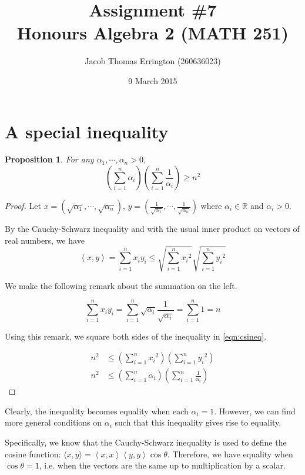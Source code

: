\documentclass{article}
\author{Jacob Thomas Errington (260636023)}
\title{Assignment \#7\\Honours Algebra 2 (MATH 251)}
\date{9 March 2015}
\newtheorem{proposition}{Proposition}
\newcommand{\R}{\mathbb{R}}
\newcommand{\norm}[1]{\left\langle #1, #1 \right\rangle}
\begin{document}
\maketitle

\section{A special inequality}

\begin{proposition}
    For any $\alpha_1, \cdots, \alpha_n > 0$,
    $$\left( \sum_{i=1}^n \alpha_i \right) \left( \sum_{i=1}^n \frac{1}{\alpha_i} \right) \geq n^2$$
\end{proposition}

\begin{proof}
    Let
    $x = (\sqrt{\alpha_1}, \cdots, \sqrt{\alpha_n})$,
    $y = (\frac{1}{\sqrt{\alpha_1}}, \cdots, \frac{1}{\sqrt{\alpha_n}})$
    where $\alpha_i \in \R$ and $\alpha_i > 0$.

    By the Cauchy-Schwarz inequality and with the usual inner product on
    vectors of real numbers, we have
    \begin{equation}
    \left\langle x, y \right\rangle = \sum_{i=1}^n { x_i y_i }
    \leq \sqrt{\sum_{i=1}^n {x_i}^2} \sqrt{\sum_{i=1}^n {y_i}^2}
    \label{eqn:csineq}
    \end{equation}

    We make the following remark about the summation on the left.

    $$\sum_{i=1}^n {x_i y_i}
    = \sum_{i=1}^n {\sqrt{\alpha_i} \frac{1}{\sqrt{\alpha_i}}}
    = \sum_{i=1}^n 1
    = n$$

    Using this remark, we square both sides of the inequality in
    \eqref{eqn:csineq}.

    \begin{align*}
        n^2 &\leq \left( \sum_{i=1}^n {x_i}^2\right) \left(\sum_{i=1}^n {y_i}^2 \right) \\
        n^2 &\leq \left( \sum_{i=1}^n \alpha_i \right) \left( \sum_{i=1}^n \frac{1}{\alpha_i} \right)
    \end{align*}
\end{proof}

Clearly, the inequality becomes equality when each $\alpha_i = 1$.
However, we can find more general conditions on $\alpha_i$ such that this
inequality gives rise to equality.

Specifically, we know that the Cauchy-Schwarz inequality is used to define the
cosine function: $\langle x, y \rangle = \norm{x} \norm{y} \cos{\theta}$.
Therefore, we have equality when $\cos{\theta} = 1$, i.e. when the vectors are
the same up to multiplication by a scalar.
\end{document}
